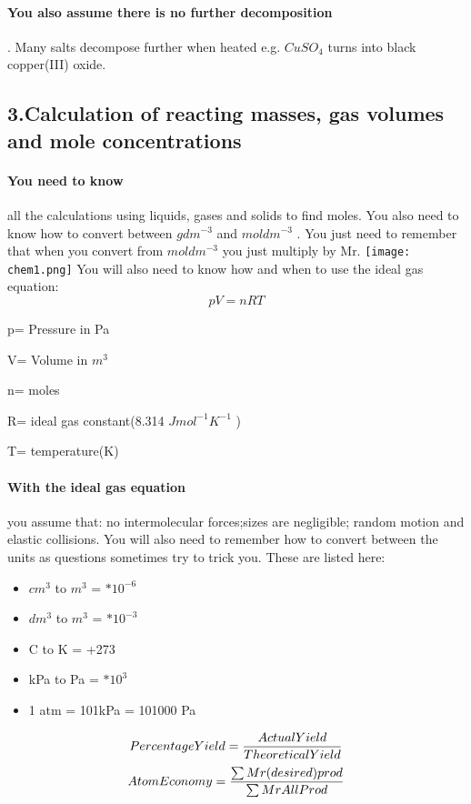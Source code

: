 \paragraph{You also assume there is no further decomposition}. Many salts decompose further when heated e.g. \(CuSO_4\) turns into black copper(III) oxide.
\subsection{3.Calculation of reacting masses, gas volumes and mole concentrations}
\paragraph{You need to know}all the calculations using liquids, gases and solids to find moles. You also need to know how to convert between \(gdm^{-3}\) and \(moldm^{-3}\) . You just need to remember that when you convert from \(moldm^{-3}\) you just multiply by Mr.
\newline
\texttt{[image: chem1.png]}
\newline You will also need to know how and when to use the ideal gas equation:
\begin{equation}
pV=nRT
\end{equation}
\begin{center} p= Pressure in Pa

 V= Volume in \(m^3\) 

n= moles

R= ideal gas constant(8.314 \(Jmol^{-1}K^{-1}\) ) 

T= temperature(K) 
\end{center}
\paragraph{With the ideal gas equation} you assume that: no intermolecular forces;sizes are negligible; random motion and elastic collisions.
You will also need to remember how to convert between the units as questions sometimes try to trick you. These are listed here:
\begin{itemize}
\item \(cm^3\) to \(m^3\) = \(*10^{-6}\)
\item \(dm^3\) to \(m^3\) = \(*10^{-3}\)
\item \degree C to K = +273
\item kPa to Pa = \(*10^3\) 
\item 1 atm = 101kPa = 101000 Pa
\end{itemize}
\newpage
\begin{equation}
Percentage Yield= \frac{Actual Yield}{Theoretical Yield}\\
\end{equation}
\newline
\begin{equation}
Atom Economy= \frac{\sum Mr(desired) prod}{\sum Mr All Prod}\\
\end{equation}
